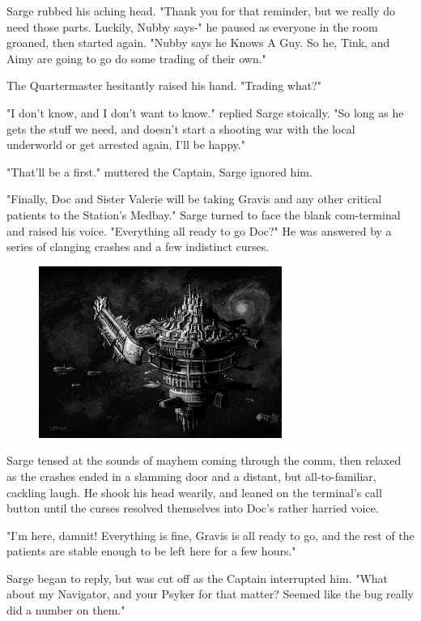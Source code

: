 Sarge rubbed his aching head. 
"Thank you for that reminder, but we really do need those parts. 
Luckily, Nubby says-" he paused as everyone in the room groaned, then started again. 
"Nubby says he Knows A Guy. 
So he, Tink, and Aimy are going to go do some trading of their own."

The Quartermaster hesitantly raised his hand. 
"Trading what?"
	
"I don't know, and I don't want to know." replied Sarge stoically. 
"So long as he gets the stuff we need, and doesn't start a shooting war with the local underworld or get arrested again, I'll be happy."

"That'll be a first." muttered the Captain, Sarge ignored him.

"Finally, Doc and Sister Valerie will be taking Gravis and any other critical patients to the Station's Medbay." Sarge turned to face the blank com-terminal and raised his voice. 
"Everything all ready to go Doc?" He was answered by a series of clanging crashes and a few indistinct curses.
\begin{figure}
	\begin{center}
		\includegraphics[width=\figwidth]{pics/14/4.png}
	\end{center}
\end{figure}
Sarge tensed at the sounds of mayhem coming through the comm, then relaxed as the crashes ended in a slamming door and a distant, but all-to-familiar, cackling laugh. 
He shook his head wearily, and leaned on the terminal's call button until the curses resolved themselves into Doc's rather harried voice. 


"I'm here, damnit! 
Everything is fine, Gravis is all ready to go, and the rest of the patients are stable enough to be left here for a few hours."

Sarge began to reply, but was cut off as the Captain interrupted him. 
"What about my Navigator, and your Psyker for that matter? 
Seemed like the bug really did a number on them."

